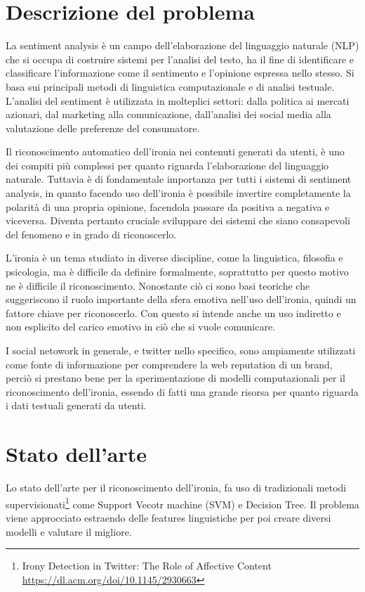 \documentclass[oneside]{book}
\begin{document}
\section{Descrizione del problema}

La sentiment analysis è un campo dell'elaborazione del linguaggio naturale (NLP) che si occupa di costruire sistemi per l'analisi del testo, ha il fine di identificare e classificare l'informazione come il sentimento e l'opinione espressa nello stesso. Si basa sui principali metodi di linguistica computazionale e di analisi testuale. L'analisi del sentiment è utilizzata in molteplici settori: dalla politica ai mercati azionari, dal marketing alla comunicazione, dall'analisi dei social media alla valutazione delle preferenze del consumatore. 

Il riconoscimento automatico dell'ironia nei contenuti generati da utenti, è uno dei compiti più complessi per quanto riguarda l'elaborazione del linguaggio naturale. Tuttavia è di fondamentale importanza per tutti i sistemi di sentiment analysis, in quanto facendo uso dell'ironia è possibile invertire completamente la polarità di una propria opinione, facendola passare da positiva a negativa e viceversa.
Diventa pertanto cruciale sviluppare dei sistemi che siano consapevoli del fenomeno e in grado di riconoscerlo.

L'ironia è un tema studiato in diverse discipline, come la linguistica, filosofia e psicologia, ma è difficile da definire formalmente, soprattutto per questo motivo ne è difficile il riconoscimento. Nonostante ciò ci sono basi teoriche che suggeriscono il ruolo importante della sfera emotiva nell'uso dell'ironia, quindi un fattore chiave per riconoscerlo. Con questo si intende anche un uso indiretto e non esplicito del carico emotivo in ciò che si vuole comunicare.

I social netowork in generale, e twitter nello specifico, sono ampiamente utilizzati come fonte di informazione per comprendere la web reputation di un brand, perciò si prestano bene per la sperimentazione di modelli computazionali per il riconoscimento dell'ironia, essendo di fatti una grande risorsa per quanto riguarda i dati testuali generati da utenti.


\section{Stato dell'arte}
Lo stato dell'arte per il riconoscimento dell'ironia, fa uso di tradizionali metodi supervisionati\footnote{Irony Detection in Twitter: The Role of Affective Content\\ \url{https://dl.acm.org/doi/10.1145/2930663}}
come Support Vecotr machine (SVM) e Decision Tree. Il problema viene approcciato estraendo delle features linguistiche per poi creare diversi modelli e valutare il migliore.
\end{document}
